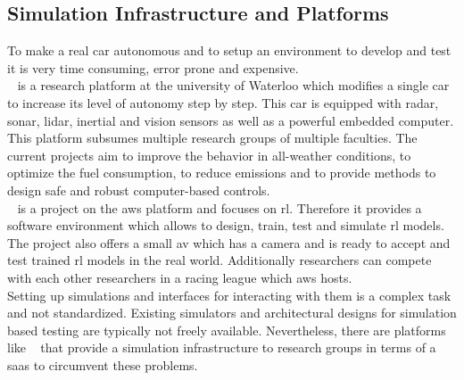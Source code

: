 \subsection{Simulation Infrastructure and Platforms}
To make a real car autonomous and to setup an environment to develop and test it is very time consuming, error prone and expensive.\\
\autonomoose{}~\cite{autonomoose} is a research platform at the university of Waterloo which modifies a single car to increase its level of autonomy step by step.
This car is equipped with radar, sonar, \gls{lidar}, inertial and vision sensors as well as a powerful embedded computer.
This platform subsumes multiple research groups of multiple faculties.
The current projects aim to improve the behavior in all-weather conditions, to optimize the fuel consumption, to reduce emissions and to provide methods to design safe and robust computer-based controls.\\
\deepracer{}~\cite{deepracer} is a project on the \gls{aws} platform and focuses on \gls{rl}.
Therefore it provides a software environment which allows to design, train, test and simulate \gls{rl} models.
The project also offers a small \gls{av} which has a camera and is ready to accept and test trained \gls{rl} models in the real world.
Additionally researchers can compete with each other researchers in a racing league which \gls{aws} hosts.\\
Setting up simulations and interfaces for interacting with them is a complex task and not standardized.
Existing simulators and architectural designs for simulation based testing are typically not freely available.
Nevertheless, there are platforms like \metamoto{}~\cite{metamoto} that provide a simulation infrastructure to research groups in terms of a \gls{saas} to circumvent these problems.

